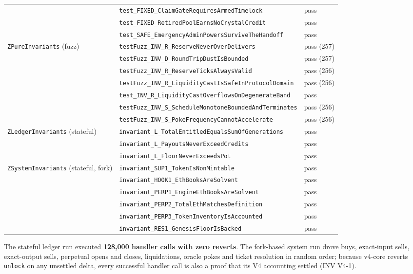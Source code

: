 \documentclass[10pt,a4paper]{article}
\newcommand{\code}[1]{\texttt{\small #1}}
\begin{document}
\begin{center}
\begin{longtable}{@{}p{5.9cm}p{7.4cm}p{1.6cm}@{}}
 & \code{test\_FIXED\_ClaimGateRequiresArmedTimelock} & pass \\
 & \code{test\_FIXED\_RetiredPoolEarnsNoCrystalCredit} & pass \\
 & \code{test\_SAFE\_EmergencyAdminPowersSurviveTheHandoff} & pass \\
\code{ZPureInvariants} (fuzz) & \code{testFuzz\_INV\_R\_ReserveNeverOverDelivers} & pass (257) \\
 & \code{testFuzz\_INV\_D\_RoundTripDustIsBounded} & pass (257) \\
 & \code{testFuzz\_INV\_R\_ReserveTicksAlwaysValid} & pass (256) \\
 & \code{testFuzz\_INV\_R\_LiquidityCastIsSafeInProtocolDomain} & pass (256) \\
 & \code{test\_INV\_R\_LiquidityCastOverflowsOnDegenerateBand} & pass \\
 & \code{testFuzz\_INV\_S\_ScheduleMonotoneBoundedAndTerminates} & pass (256) \\
 & \code{testFuzz\_INV\_S\_PokeFrequencyCannotAccelerate} & pass (256) \\
\code{ZLedgerInvariants} (stateful) & \code{invariant\_L\_TotalEntitledEqualsSumOfGenerations} & pass \\
 & \code{invariant\_L\_PayoutsNeverExceedCredits} & pass \\
 & \code{invariant\_L\_FloorNeverExceedsPot} & pass \\
\code{ZSystemInvariants} (stateful, fork) & \code{invariant\_SUP1\_TokenIsNonMintable} & pass \\
 & \code{invariant\_HOOK1\_EthBooksAreSolvent} & pass \\
 & \code{invariant\_PERP1\_EngineEthBooksAreSolvent} & pass \\
 & \code{invariant\_PERP2\_TotalEthMatchesDefinition} & pass \\
 & \code{invariant\_PERP3\_TokenInventoryIsAccounted} & pass \\
 & \code{invariant\_RES1\_GenesisFloorIsBacked} & pass \\
\end{longtable}
\end{center}

\noindent
The stateful ledger run executed \textbf{128{,}000 handler calls with zero reverts}. The
fork-based system run drove buys, exact-input sells, exact-output sells, perpetual opens
and closes, liquidations, oracle pokes and ticket resolution in random order; because
v4-core reverts \code{unlock} on any unsettled delta, every successful handler call is also
a proof that its V4 accounting settled (INV V4-1).
\end{document}
